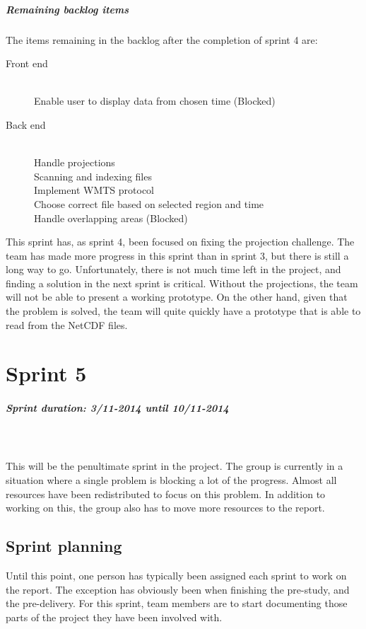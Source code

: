 \documentclass[11pt,a4paper,titlepage,oneside]{report}
\begin{document}
\paragraph{Remaining backlog items}
The items remaining in the backlog after the completion of sprint 4 are:

\begin{description}
	\item[Front end] \hfill \\
	Enable user to display data from chosen time (Blocked)
	\item[Back end] \hfill \\
	Handle projections \hfill \\
	Scanning and indexing files \hfill \\
	Implement WMTS protocol \hfill \\
	Choose correct file based on selected region and time \hfill \\
	Handle overlapping areas (Blocked)
\end{description}

This sprint has, as sprint 4, been focused on fixing the projection challenge. The team has made more progress in this sprint than in sprint 3, but there is still a long way to go. Unfortunately, there is not much time left in the project, and finding a solution in the next sprint is critical. Without the projections, the team will not be able to present a working prototype. On the other hand, given that the problem is solved, the team will quite quickly have a prototype that is able to read from the NetCDF files. 

\chapter{Sprint 5}
\paragraph{Sprint duration: 3/11-2014 until 10/11-2014} \hfill \\
\\
\noindent
This will be the penultimate sprint in the project. The group is currently in a situation where a single problem is blocking a lot of the progress. Almost all resources have been redistributed to focus on this problem. In addition to working on this, the group also has to move more resources to the report. 

\section{Sprint planning}
Until this point, one person has typically been assigned each sprint to work on the report. The exception has obviously been when finishing the pre-study, and the pre-delivery. For this sprint, team members are to start documenting those parts of the project they have been involved with. 
\end{document}

